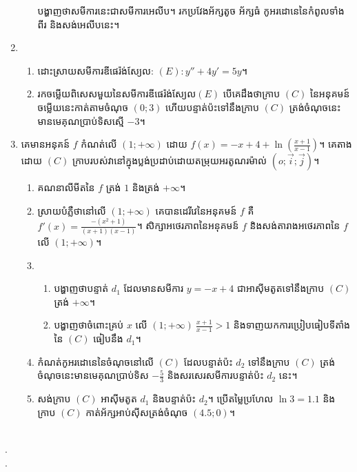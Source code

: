 \documentclass{officialexam}
\begin{document}
\begin{enumerate}[I]
\begin{enumerate}[1]
		បង្ហាញថាសមីការនេះជាសមីការអេលីប។ រកប្រវែងអ័ក្សតូច អ័ក្សធំ កូអរដោនេនៃកំពូលទាំងពីរ និងសង់អេលីបនេះ។
	\end{enumerate}
	\item \begin{enumerate}[a]
		\item ដោះស្រាយសមីការឌីផេរ៉ង់ស្យែល: $\left(E\right):y''+4y'=5y$។
		\item រកចម្លើយពិសេសមួយនៃសមីការឌីផេរ៉ង់ស្យែល​ $\left(E\right)$ បើគេដឹងថាក្រាប $\left(C\right)$ នៃអនុគមន៍ចម្លើយនេះកាត់តាមចំណុច $\left(0;3\right)$ ហើយបន្ទាត់ប៉ះទៅនឹងក្រាប $\left(C\right)$ ត្រង់ចំណុចនេះមានមេគុណប្រាប់ទិសស្មើ $-3$។
	\end{enumerate}
	\item គេមានអនុគន៍ $f$ កំណត់លើ $\left(1;+\infty\right)$ ដោយ $f(x)=-x+4+\ln\left(\frac{x+1}{x-1}\right)$។ គេតាងដោយ $\left(C\right)$ ក្រាបរបស់វានៅក្នុងប្លង់ប្រដាប់ដោយតម្រុយអរតូណរម៉ាល់ $\left(o;\vec{i};\vec{j}\right)$។
	\begin{enumerate}[1]
		\item គណនាលីមីតនៃ $f$ ត្រង់ $1$ និងត្រង់ $+\infty$។
		\item ស្រាយបំភ្លឺថានៅលើ $\left(1;+\infty\right)$ គេបានដេរីវេនៃអនុគមន៍ $f$ គឺ $f'(x)=\frac{-\left(x^2+1\right)}{\left(x+1\right)\left(x-1\right)}$។ សិក្សាអថេរភាពនៃអនុគមន៍ $f$ និងសង់តារាងអថេរភាពនៃ $f$ លើ $\left(1;+\infty\right)$។
		\item \begin{enumerate}[a]
			\item បង្ហាញថាបន្ទាត់ $d_1$ ដែលមានសមីការ $y=-x+4$ ជាអាសុីមតូតទៅនឹងក្រាប $\left(C\right)$ ត្រង់ $+\infty$។
			\item បង្ហាញថាចំពោះគ្រប់ $x$ លើ $\left(1;+\infty\right)~\frac{x+1}{x-1}>1$ និងទាញយកការប្រៀបធៀបទីតាំងនៃ $\left(C\right)$ ធៀបនឹង $d_1$។ 
		\end{enumerate}\newpage
		\item កំណត់កូអរដោនេនៃចំណុចនៅលើ $\left(C\right)$ ដែលបន្ទាត់ប៉ះ $d_2$ ទៅនឹងក្រាប $\left(C\right)$ ត្រង់ចំណុចនេះមានមេគុណប្រាប់ទិស $-\frac{5}{3}$ និងសរសេរសមីការបន្ទាត់ប៉ះ $d_2$ នេះ។
		\item សង់ក្រាប $\left(C\right)$ អាសុីមតូត $d_1$ និងបន្ទាត់ប៉ះ $d_2$។ ប្រើតម្លៃប្រហែល $\ln3=1.1$ និងក្រាប $\left(C\right)$ កាត់អ័ក្សអាប់សុីសត្រង់ចំណុច $\left(4.5;0\right)$។
	\end{enumerate}
\end{enumerate}
\\
{\color{white}.}\dotfill\\
{\color{white}.}\dotfill\\
\end{document}
